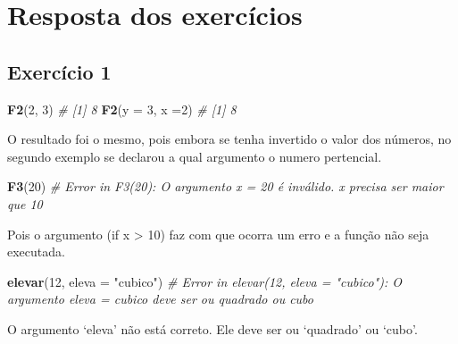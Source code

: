 \documentclass[
]{book}
\newenvironment{Shaded}{\begin{snugshade}}{\end{snugshade}}
\newcommand{\CommentTok}[1]{\textcolor[rgb]{0.56,0.35,0.01}{\textit{#1}}}
\newcommand{\DataTypeTok}[1]{\textcolor[rgb]{0.13,0.29,0.53}{#1}}
\newcommand{\DecValTok}[1]{\textcolor[rgb]{0.00,0.00,0.81}{#1}}
\newcommand{\KeywordTok}[1]{\textcolor[rgb]{0.13,0.29,0.53}{\textbf{#1}}}
\newcommand{\NormalTok}[1]{#1}
\newcommand{\StringTok}[1]{\textcolor[rgb]{0.31,0.60,0.02}{#1}}
\numberwithin{equation}{section}
\begin{document}
\hypertarget{resposta-dos-exercuxedcios}{%
\chapter{Resposta dos exercícios}\label{resposta-dos-exercuxedcios}}

\hypertarget{exerc1}{%
\section{Exercício 1}\label{exerc1}}

\begin{Shaded}
\begin{Highlighting}[]
\KeywordTok{F2}\NormalTok{(}\DecValTok{2}\NormalTok{, }\DecValTok{3}\NormalTok{)}
\CommentTok{\# [1] 8}
\KeywordTok{F2}\NormalTok{(}\DataTypeTok{y =} \DecValTok{3}\NormalTok{, }\DataTypeTok{x =}\DecValTok{2}\NormalTok{)}
\CommentTok{\# [1] 8}
\end{Highlighting}
\end{Shaded}

O resultado foi o mesmo, pois embora se tenha invertido o valor dos números, no segundo exemplo se declarou a qual argumento o numero pertencial.

\begin{Shaded}
\begin{Highlighting}[]
\KeywordTok{F3}\NormalTok{(}\DecValTok{20}\NormalTok{)}
\CommentTok{\# Error in F3(20): O argumento x = 20 é inválido. \textquotesingle{}x\textquotesingle{} precisa ser maior que 10}
\end{Highlighting}
\end{Shaded}

Pois o argumento (if x \textgreater{} 10) faz com que ocorra um erro e a função não seja executada.

\begin{Shaded}
\begin{Highlighting}[]
\KeywordTok{elevar}\NormalTok{(}\DecValTok{12}\NormalTok{, }\DataTypeTok{eleva =} \StringTok{"cubico"}\NormalTok{)}
\CommentTok{\# Error in elevar(12, eleva = "cubico"): O argumento eleva = cubico deve ser ou \textquotesingle{}quadrado\textquotesingle{} ou \textquotesingle{}cubo\textquotesingle{}}
\end{Highlighting}
\end{Shaded}

O argumento `eleva' não está correto. Ele deve ser ou `quadrado' ou `cubo'.
\end{document}
